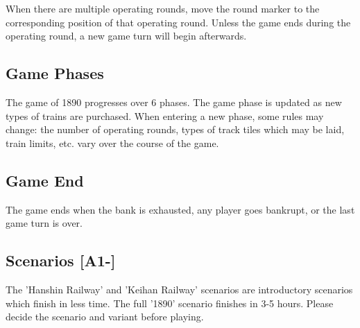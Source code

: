 \documentclass{article}
\begin{document}
\begin{CJK}{UTF8}{min}
When there are multiple operating rounds, move the round marker to the
corresponding position of that operating round. Unless the game ends during
the operating round, a new game turn will begin afterwards.



\subsection{Game Phases}
The game of 1890 progresses over 6 phases. The game phase is updated
as new types of trains are purchased. When entering a new phase, some
rules may change: the number of operating rounds, types of track tiles
which may be laid, train limits, etc. vary over the course of the
game.



\subsection{Game End}
The game ends when the bank is exhausted, any player goes bankrupt,
or the last game turn is over.


\subsection{Scenarios [A1-]}
The 'Hanshin Railway' and 'Keihan Railway' scenarios are introductory
scenarios which finish in less time. The full '1890' scenario finishes
in 3-5 hours. Please decide the scenario and variant before playing.


\end{CJK}
\end{document}
